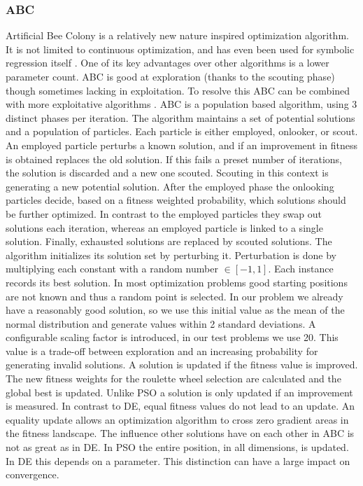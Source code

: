 \subsubsection{ABC}
Artificial Bee Colony \citep{ABC} is a relatively new nature inspired optimization algorithm. It is not limited to continuous optimization, and has even been used for symbolic regression itself \cite{ABCSR}. One of its key advantages over other algorithms is a lower parameter count. ABC is good at exploration (thanks to the scouting phase) though sometimes lacking in exploitation. To resolve this ABC can be combined with more exploitative algorithms \citep{ABCPSO}.
ABC is a population based algorithm, using 3 distinct phases per iteration. The algorithm maintains a set of potential solutions and a population of particles. Each particle is either employed, onlooker, or scout. An employed particle perturbs a known solution, and if an improvement in fitness is obtained replaces the old solution. If this fails a preset number of iterations, the solution is discarded and a new one scouted. Scouting in this context is generating a new potential solution. After the employed phase the onlooking particles decide, based on a fitness weighted probability, which solutions should be further optimized. In contrast to the employed particles they swap out solutions each iteration, whereas an employed particle is linked to a single solution. Finally, exhausted solutions are replaced by scouted solutions.
The algorithm initializes its solution set by perturbing it. Perturbation is done by multiplying each constant with a random number $\in [-1,1]$. Each instance records its best solution. In most optimization problems good starting positions are not known and thus a random point is selected. In our problem we already have a reasonably good solution, so we use this initial value as the mean of the normal distribution and generate values within 2 standard deviations. A configurable scaling factor is introduced, in our test problems we use 20. This value is a trade-off between exploration and an increasing probability for generating invalid solutions.  A solution is updated if the fitness value is improved. The new fitness weights for the roulette wheel selection are calculated and the global best is updated. Unlike PSO a solution is only updated if an improvement is measured. In contrast to DE, equal fitness values do not lead to an update. An equality update allows an optimization algorithm to cross zero gradient areas in the fitness landscape. The influence other solutions have on each other in ABC is not as great as in DE. In PSO the entire position, in all dimensions, is updated. In DE this depends on a parameter. This distinction can have a large impact on convergence. 
